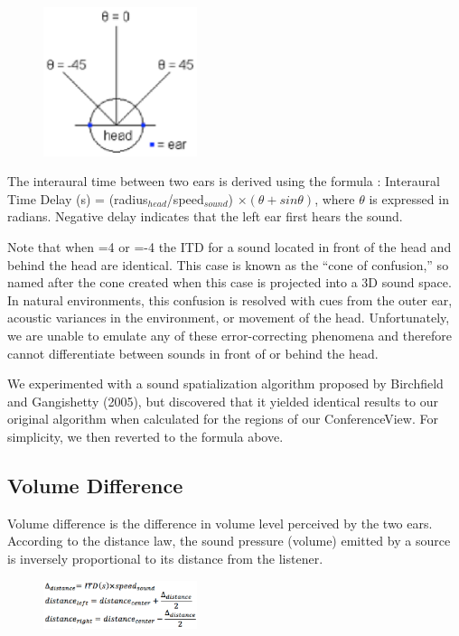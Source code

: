 \documentclass[12pt, letterpaper]{article}
\begin{document}
\begin{figure}[htbp]
\begin{center}
    \includegraphics[width=0.4\textwidth]{audio.eps}
\end{center}
\end{figure}

The interaural time between two ears is derived using the formula : Interaural Time Delay (s) = (radius$_{head}$/speed$_{sound}$) $\times (\theta + sin \theta)$, where $\theta$ is expressed in radians. Negative delay indicates that the left ear first hears the sound. 

Note that when =4 or =-4 the ITD for a sound located in front of the head and behind the head are identical. This case is known as the “cone of confusion,” so named after the cone created when this case is projected into a 3D sound space. In natural environments, this confusion is resolved with cues from the outer ear, acoustic variances in the environment, or movement of the head. Unfortunately, we are unable to emulate any of these error-correcting phenomena and therefore cannot differentiate between sounds in front of or behind the head.

We experimented with a sound spatialization algorithm proposed by Birchfield and Gangishetty (2005), but discovered that it yielded identical results to our original algorithm when calculated for the regions of our ConferenceView. For simplicity, we then reverted to the formula above.

\subsection{Volume Difference}
Volume difference is the difference in volume level perceived by the two ears.  According to the distance law, the sound pressure (volume) emitted by a source is inversely proportional to its distance from the listener.

\begin{figure}[htbp]
\begin{center}
    \includegraphics[width=0.4\textwidth]{audio3.eps}
\end{center}
\end{figure}
\end{document}

